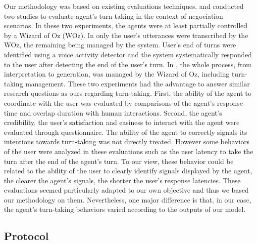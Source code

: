 Our methodology was based on existing evaluations techniques.
\cite{skantze_towards_2010} and \cite{de_vault_toward_2015} conducted two studies to evaluate agent's turn-taking in the context of negociation scenarios. In these two experiments, the agents were at least partially controlled by a Wizard of Oz (WOz). In \cite{skantze_towards_2010} only the user's utterances were transcribed by the WOz, the remaining being managed by the system. User's end of turns were identified using a voice activity detector and the system systematically responded to the user after detecting the end of the user's turn. In \cite{de_vault_toward_2015}, the whole process, from interpretation to generation, was managed by the Wizard of Oz, including turn-taking management. These two experiments had the advantage to answer similar research questions as ours regarding turn-taking. First, the ability of the agent to coordinate with the user was evaluated by comparisons of the agent's response time and overlap duration with human interactions. Second, the agent's credibility, the user's satisfaction and easiness to interact with the agent were evaluated through questionnaire. The ability of the agent to correctly signals its intentions towards turn-taking was not directly treated. However some behaviors of the user were analyzed in these evaluations such as the user latency to take the turn after the end of the agent's turn. To our view, these behavior could be related to the ability of the user to clearly identify signals displayed by the agent, the clearer the agent's signals, the shorter the user's response latencies. These evaluations seemed particularly adapted to our own objective and thus we based our methodology on them. Nevertheless, one major difference is that, in our case, the agent's turn-taking behaviors varied according to the outputs of our model. 

\subsection{Protocol}

